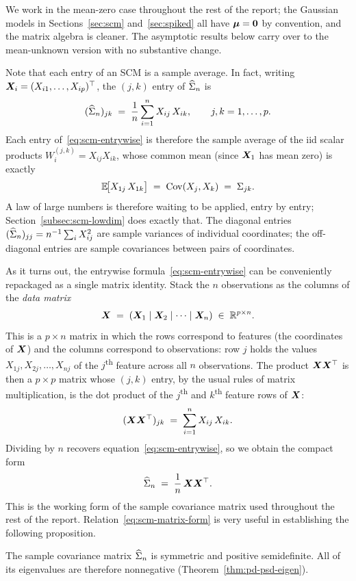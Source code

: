 We work in the mean-zero case throughout the rest of the report; the Gaussian models in Sections~\ref{sec:scm} and~\ref{sec:spiked} all have \(\bm{\mu} = \bm{0}\) by convention, and the matrix algebra is cleaner. The asymptotic results below carry over to the mean-unknown version with no substantive change.

Note that each entry of an SCM is a sample average. In fact, writing \(\bm{X}_i = (X_{i1}, \ldots, X_{ip})^{\top}\), the \((j, k)\) entry of \(\widehat{\Sigma}_n\) is
\begin{equation}
  (\widehat{\Sigma}_n)_{jk} \;=\; \frac{1}{n} \sum_{i = 1}^n X_{ij}\, X_{ik}, \qquad j, k = 1, \ldots, p.
  \label{eq:scm-entrywise}
\end{equation}
Each entry of~\eqref{eq:scm-entrywise} is therefore the sample average of the iid scalar products \(W_i^{(j,k)} = X_{ij} X_{ik}\), whose common mean (since \(\bm{X}_1\) has mean zero) is exactly
\[
  \mathbb{E}\!\bigl[X_{1j}\, X_{1k}\bigr] \;=\; \operatorname{Cov}(X_j, X_k) \;=\; \Sigma_{jk}.
\]
A law of large numbers is therefore waiting to be applied, entry by entry; Section~\ref{subsec:scm-lowdim} does exactly that. The diagonal entries \((\widehat{\Sigma}_n)_{jj} = n^{-1} \sum_i X_{ij}^2\) are sample variances of individual coordinates; the off-diagonal entries are sample covariances between pairs of coordinates.

As it turns out, the entrywise formula~\eqref{eq:scm-entrywise} can be conveniently repackaged as a single matrix identity. Stack the \(n\) observations as the columns of the \emph{data matrix}
\[
  \bm{X} \;=\; (\bm{X}_1 \mid \bm{X}_2 \mid \cdots \mid \bm{X}_n) \;\in\; \mathbb{R}^{p \times n}.
\]
This is a \(p \times n\) matrix in which the rows correspond to features (the coordinates of \(\bm{X}\)) and the columns correspond to observations: row \(j\) holds the values \(X_{1j}, X_{2j}, \ldots, X_{nj}\) of the \(j\)\textsuperscript{th} feature across all \(n\) observations. The product \(\bm{X} \bm{X}^{\top}\) is then a \(p \times p\) matrix whose \((j, k)\) entry, by the usual rules of matrix multiplication, is the dot product of the \(j\)\textsuperscript{th} and \(k\)\textsuperscript{th} feature rows of \(\bm{X}\):
\[
  (\bm{X} \bm{X}^{\top})_{jk} \;=\; \sum_{i = 1}^n X_{ij}\, X_{ik}.
\]
Dividing by \(n\) recovers equation~\eqref{eq:scm-entrywise}, so we obtain the compact form
\begin{equation}
  \widehat{\Sigma}_n \;=\; \frac{1}{n}\, \bm{X} \bm{X}^{\top}.
  \label{eq:scm-matrix-form}
\end{equation}
This is the working form of the sample covariance matrix used throughout the rest of the report. Relation~\eqref{eq:scm-matrix-form} is very useful in establishing the following proposition.
\begin{proposition}\label{prop:scm-psd}
The sample covariance matrix \(\widehat{\Sigma}_n\) is symmetric and positive semidefinite. All of its eigenvalues are therefore nonnegative (Theorem~\ref{thm:pd-psd-eigen}).
\end{proposition}

